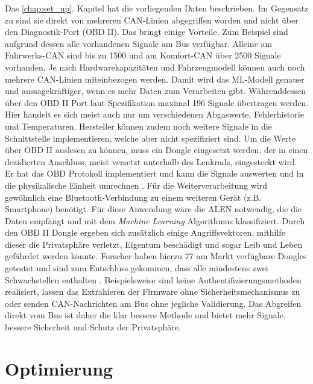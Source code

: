 Das \ref{chap:set_up}. Kapitel hat die vorliegenden Daten beschrieben. Im Gegensatz zu \cite{Gahr2018} sind sie direkt von mehreren CAN-Linien abgegriffen worden und nicht über den Diagnostik-Port (OBD II). Das bringt einige Vorteile. Zum Beispiel sind aufgrund dessen alle vorhandenen Signale am Bus verfügbar. Alleine am Fahrwerks-CAN sind bis zu 1500 und am Komfort-CAN über 2500 Signale vorhanden. Je nach Hardwarekapazitäten und Fahrzeugmodell können auch noch mehrere CAN-Linien miteinbezogen werden. Damit wird das ML-Modell genauer und aussagekräftiger, wenn es mehr Daten zum Verarbeiten gibt. Währenddessen über den OBD II Port \cite{SAEII} laut Spezifikation maximal 196 Signale übertragen werden. Hier handelt es sich meist auch nur um verschiedenen Abgaswerte, Fehlerhistorie und Temperaturen. Hersteller können zudem noch weitere Signale in die Schnittstelle implementieren, welche aber nicht spezifiziert sind. Um die Werte über OBD II auslesen zu können, muss ein Dongle eingesetzt werden, der in einen dezidierten Anschluss, meist versetzt unterhalb des Lenkrads, eingesteckt wird. Er hat das OBD Protokoll implementiert und kann die Signale auswerten und in die physikalische Einheit umrechnen \cite{OBD20}. Für die Weiterverarbeitung wird gewöhnlich eine Bluetooth-Verbindung zu einem weiteren Gerät (z.B. Smartphone) benötigt. Für diese Anwendung wäre die ALEN notwendig, die die Daten empfängt und mit dem \textit{Machine Learning} Algorithmus klassifiziert. Durch den OBD II Dongle ergeben sich zusätzlich einige Angriffsvektoren, mithilfe dieser die Privatsphäre verletzt, Eigentum beschädigt und sogar Leib und Leben gefährdet werden könnte. Forscher haben hierzu 77 am Markt verfügbare Dongles getestet und sind zum Entschluss gekommen, dass alle mindestens zwei Schwachstellen enthalten \cite{USENIX20}. Beispielsweise sind keine Authentifizierungsmethoden realisiert, lassen das Extrahieren der Firmware ohne Sicherheitsmechanismus zu oder senden CAN-Nachrichten am Bus ohne jegliche Validierung. Das Abgreifen direkt vom Bus ist daher die klar bessere Methode und bietet mehr Signale, bessere Sicherheit und Schutz der Privatsphäre.

\section{Optimierung}

